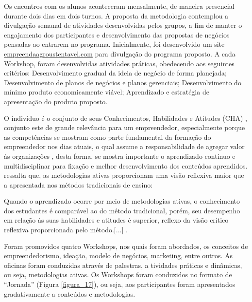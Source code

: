 Os encontros com os alunos aconteceram mensalmente, de maneira presencial durante dois dias em dois turnos. A proposta da metodologia contemplou a divulgação semanal de atividades desenvolvidas pelos grupos, a fim de manter o engajamento dos participantes e desenvolvimento das propostas de negócios pensadas ao entrarem no programa. Inicialmente, foi desenvolvido um site \href{http://www.empreendaagrosustentavel.com}{empreendaagroustentavel.com}  para divulgação do programa proposto. A cada Workshop, foram desenvolvidas atividades práticas, obedecendo aos seguintes critérios: Desenvolvimento gradual da ideia de negócio de forma planejada; Desenvolvimento de planos de negócios e planos gerenciais; Desenvolvimento do mínimo produto economicamente viável; Aprendizado e estratégia de apresentação do produto proposto.
 

O indivíduo é o conjunto de seus Conhecimentos, Habilidades e Atitudes (CHA) \cite{dutra_competencias_2004}, conjunto este de grande relevância para um empreendedor, especialmente porque as competências se mostram como parte fundamental da formação do empreendedor nos dias atuais, o qual assume a responsabilidade de agregar valor às organizações \cite{ferreira_conhecimento_2019}, desta forma, se mostra importante o aprendizado contínuo e multidisciplinar para fixação e melhor desenvolvimento dos conteúdos aprendidos.  ressalta que, as metodologias ativas proporcionam uma visão reflexiva maior que a apresentada nos métodos tradicionais de ensino: 

\begin{citacao}
[...] Quando o aprendizado ocorre por meio de metodologias ativas, o conhecimento dos estudantes é comparável ao do método tradicional, porém, seu desempenho em relação às suas habilidades e atitudes é superior, reflexo da visão crítico reflexiva proporcionada pelo método.[...] \cite{limberger_metodologias_2013}.
\end{citacao}


Foram promovidos quatro Workshops, nos quais foram abordados, os conceitos de empreendedorismo, ideação, modelo de negócios, marketing, entre outros. As oficinas foram conduzidas através de palestras, a    tividades práticas e dinâmicas, ou seja, metodologias ativas. Os Workshops foram conduzidos no formato de “Jornada” (Figura \ref{figura_17}), ou seja, aos participantes foram apresentados gradativamente a conteúdos e metodologias. 


